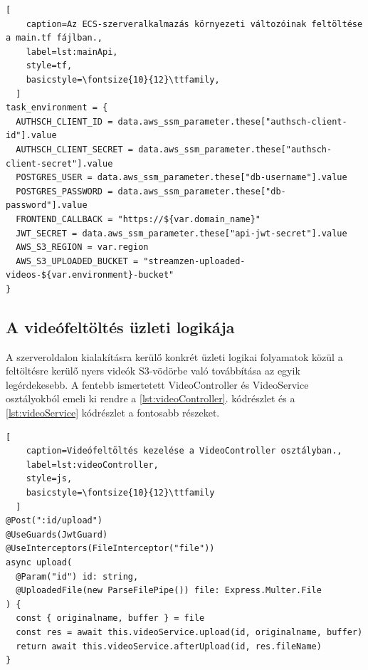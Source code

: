 \begin{minipage}{0.92\textwidth}
  \begin{lstlisting}[
    caption=Az ECS-szerveralkalmazás környezeti változóinak feltöltése a main.tf fájlban.,
    label=lst:mainApi,
    style=tf,
    basicstyle=\fontsize{10}{12}\ttfamily,
  ]
task_environment = {
  AUTHSCH_CLIENT_ID = data.aws_ssm_parameter.these["authsch-client-id"].value
  AUTHSCH_CLIENT_SECRET = data.aws_ssm_parameter.these["authsch-client-secret"].value
  POSTGRES_USER = data.aws_ssm_parameter.these["db-username"].value
  POSTGRES_PASSWORD = data.aws_ssm_parameter.these["db-password"].value
  FRONTEND_CALLBACK = "https://${var.domain_name}"
  JWT_SECRET = data.aws_ssm_parameter.these["api-jwt-secret"].value
  AWS_S3_REGION = var.region
  AWS_S3_UPLOADED_BUCKET = "streamzen-uploaded-videos-${var.environment}-bucket"
}
\end{lstlisting}
\end{minipage}

\subsection{A videófeltöltés üzleti logikája}

A szerveroldalon kialakításra kerülő konkrét üzleti logikai folyamatok közül a feltöltésre kerülő nyers videók S3-vödörbe való továbbítása az egyik legérdekesebb. A fentebb ismertetett VideoController és VideoService osztályokból emeli ki rendre a \ref{lst:videoController}. kódrészlet és a \ref{lst:videoService} kódrészlet a fontosabb részeket.

\begin{minipage}{0.92\textwidth}
  \begin{lstlisting}[
    caption=Videófeltöltés kezelése a VideoController osztályban.,
    label=lst:videoController,
    style=js,
    basicstyle=\fontsize{10}{12}\ttfamily
  ]
@Post(":id/upload")
@UseGuards(JwtGuard)
@UseInterceptors(FileInterceptor("file"))
async upload(
  @Param("id") id: string,
  @UploadedFile(new ParseFilePipe()) file: Express.Multer.File
) {
  const { originalname, buffer } = file
  const res = await this.videoService.upload(id, originalname, buffer)
  return await this.videoService.afterUpload(id, res.fileName)
}
\end{lstlisting}
\end{minipage}

